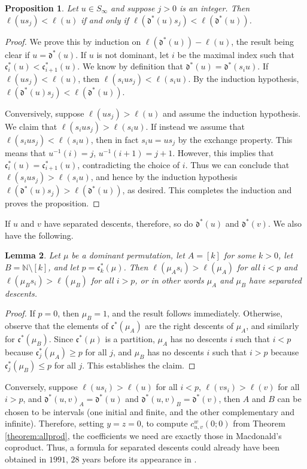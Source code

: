 \documentclass[reqno]{amsart}
\newtheorem{lemma}{Lemma}[subsection]
\newtheorem{proposition}[lemma]{Proposition}
\theoremstyle{definition}
\theoremstyle{remark}
\numberwithin{equation}{subsection}
\newcommand{\dom}{\mathfrak{d}}
\newcommand{\ldom}{\dom^*}
\newcommand{\code}{\mathfrak{c}}
\begin{document}
\begin{proposition} \label{proposition:mudescents}
Let $u\in S_\infty$ and suppose $j>0$ is an integer. Then $\ell(us_j)<\ell(u)$ if and only if $\ell(\ldom(u)s_j)<\ell(\ldom(u))$.
\end{proposition}
\begin{proof}
We prove this by induction on $\ell(\ldom(u))-\ell(u)$, the result being clear if $u=\ldom(u)$. If $u$ is not dominant, let $i$ be the maximal index such that $\code_i^*(u)<\code_{i+1}^*(u)$. We know by definition that $\ldom(u)=\ldom(s_iu)$. If $\ell(us_j)<\ell(u)$, then $\ell(s_ius_j)<\ell(s_iu)$. By the induction hypothesis, $\ell(\ldom(u)s_j)<\ell(\ldom(u))$. 

Conversively, suppose $\ell(us_j)>\ell(u)$ and assume the induction hypothesis.  We claim that $\ell(s_ius_j)>\ell(s_iu)$. If instead we assume that $\ell(s_ius_j)<\ell(s_iu)$, then in fact $s_iu=us_j$ by the exchange property. This means that $u^{-1}(i)=j$, $u^{-1}(i+1)=j+1$. However, this implies that $\code_i^*(u)=\code_{i+1}^*(u)$, contradicting the choice of $i$. Thus we can conclude that $\ell(s_ius_j)>\ell(s_iu)$, and hence by the induction hypothesis $\ell(\ldom(u)s_j)>\ell(\ldom(u))$, as desired. This completes the induction and proves the proposition.
\end{proof}

If $u$ and $v$ have separated descents, therefore, so do $\ldom(u)$ and $\ldom(v)$. We also have the following.

\begin{lemma} \label{lemma:separateddom}
Let $\mu$ be a dominant permutation, let $A=[k]$ for some $k>0$, let $B=\mathbb N\setminus [k]$, and let $p=\code^*_k(\mu)$. Then $\ell(\mu_As_i)>\ell(\mu_A)$ for all $i<p$ and $\ell(\mu_Bs_i)>\ell(\mu_B)$ for all $i>p$, or in other words $\mu_A$ and $\mu_B$ have separated descents.
\end{lemma}
\begin{proof}
If $p=0$, then $\mu_B=1$, and the result follows immediately. Otherwise, observe that the elements of $\code^*(\mu_A)$ are the right descents of $\mu_A$, and similarly for $\code^*(\mu_B)$. Since $\code^*(\mu)$ is a partition, $\mu_A$ has no descents $i$ such that $i<p$ because $\code^*_j(\mu_A)\geq p$ for all $j$, and $\mu_B$ has no descents $i$ such that $i>p$ because $\code_j^*(\mu_B)\leq p$ for all $j$. This establishes the claim.
\end{proof}

Conversely, suppose $\ell(us_i)>\ell(u)$ for all $i<p$, $\ell(vs_i)>\ell(v)$ for all $i>p$, and $\ldom(u,v)_A=\ldom(u)$ and $\ldom(u,v)_B=\ldom(v)$, then $A$ and $B$ can be chosen to be intervals (one initial and finite, and the other complementary and infinite). Therefore, setting $y=z=0$, to compute $c_{u,v}^w(0;0)$ from Theorem \ref{theorem:allprod}, the coefficients we need are exactly those in Macdonald's coproduct. Thus, a formula for separated descents could already have been obtained in $1991$, $28$ years before its appearance in \cite{kzj}.
\end{document}
